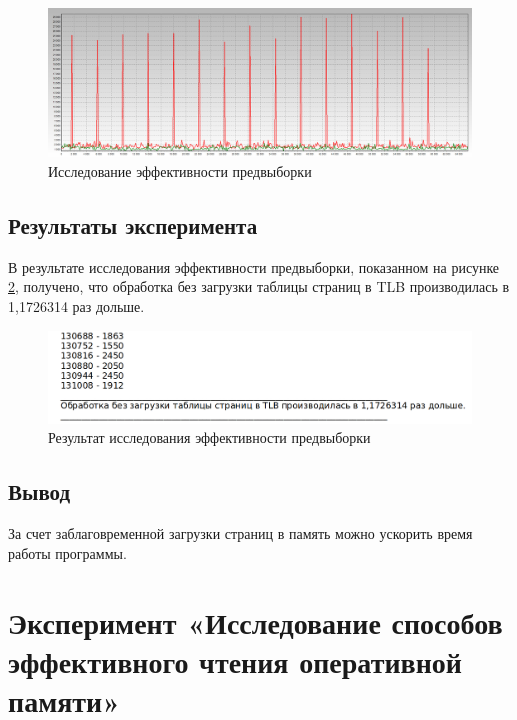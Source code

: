 \begin{figure}[H]
	\begin{center}
		\includegraphics[scale=0.2]{img/lab_03_03_02.jpg}
	\end{center}
	\captionsetup{justification=centering}
	\caption{Исследование эффективности предвыборки}
	\label{img:effective}
\end{figure}

\section{Результаты эксперимента}

В результате исследования эффективности предвыборки, показанном на рисунке \ref{img:effective_result}, получено, что обработка без загрузки таблицы страниц в TLB производилась в 1,1726314 раз дольше.

\begin{figure}[H]
	\begin{center}
		\includegraphics[scale=0.3]{img/effective_result.png}
	\end{center}
	\captionsetup{justification=centering}
	\caption{Результат исследования эффективности предвыборки}
	\label{img:effective_result}
\end{figure}

\section{Вывод}

За счет заблаговременной загрузки страниц в память можно ускорить время работы программы.

\chapter{Эксперимент «Исследование способов эффективного чтения оперативной памяти»}

